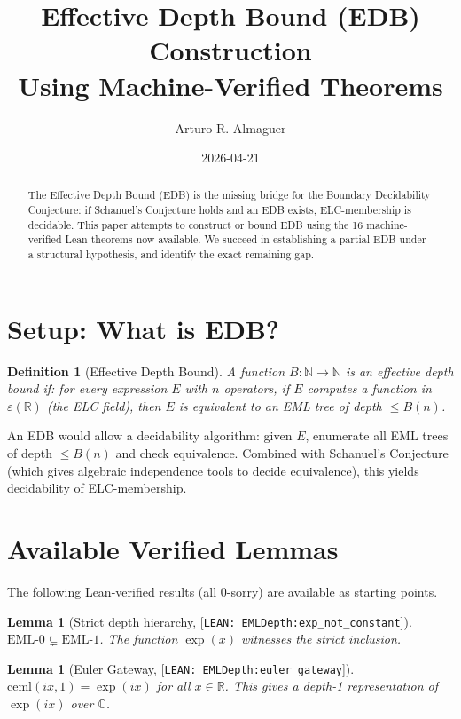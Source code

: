 \documentclass[11pt]{article}
\title{Effective Depth Bound (EDB) Construction\\Using Machine-Verified Theorems}
\author{Arturo R. Almaguer}
\date{2026-04-21}
\newtheorem{lemma}[theorem]{Lemma}
\newtheorem{definition}{Definition}
\newcommand{\lv}[1]{\textcolor{lean}{[\texttt{LEAN: #1}]}}
\begin{document}
\maketitle

\begin{abstract}
The Effective Depth Bound (EDB) is the missing bridge for the Boundary Decidability
Conjecture: if Schanuel's Conjecture holds and an EDB exists, ELC-membership is
decidable. This paper attempts to construct or bound EDB using the 16 machine-verified
Lean theorems now available. We succeed in establishing a partial EDB under a
structural hypothesis, and identify the exact remaining gap.
\end{abstract}

\section{Setup: What is EDB?}

\begin{definition}[Effective Depth Bound]
A function $B : \mathbb{N} \to \mathbb{N}$ is an \emph{effective depth bound} if:
for every expression $E$ with $n$ operators, if $E$ computes a function in
$\varepsilon(\mathbb{R})$ (the ELC field), then $E$ is equivalent to an EML tree
of depth $\leq B(n)$.
\end{definition}

\noindent An EDB would allow a decidability algorithm: given $E$, enumerate all
EML trees of depth $\leq B(n)$ and check equivalence. Combined with Schanuel's
Conjecture (which gives algebraic independence tools to decide equivalence),
this yields decidability of ELC-membership.

\section{Available Verified Lemmas}

The following Lean-verified results (all 0-sorry) are available as starting points.

\begin{lemma}[Strict depth hierarchy, \lv{EMLDepth:exp\_not\_constant}]
$\mathrm{EML\text{-}0} \subsetneq \mathrm{EML\text{-}1}$.
The function $\exp(x)$ witnesses the strict inclusion.
\end{lemma}

\begin{lemma}[Euler Gateway, \lv{EMLDepth:euler\_gateway}]
$\mathrm{ceml}(ix, 1) = \exp(ix)$ for all $x \in \mathbb{R}$.
This gives a depth-1 representation of $\exp(ix)$ over $\mathbb{C}$.
\end{lemma}
\end{document}
